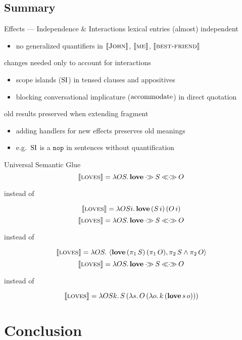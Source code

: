 \documentclass{beamer}
\begin{document}
\subsection{Summary}

\begin{frame}{Effects --- Independence \& Interactions}
  lexical entries (almost) independent
  \begin{itemize}
  \item no generalized quantifiers in $\llbracket \textsc{John} \rrbracket$, $\llbracket \textsc{me} \rrbracket$,
    $\llbracket \textsc{best-friend} \rrbracket$
  \end{itemize}

  changes needed only to account for interactions
  \begin{itemize}
  \item scope islands ($\operatorname{SI}$) in tensed clauses and appositives
  \item blocking conversational implicature ($\operatorname{accommodate}$) in direct
    quotation
  \end{itemize}

  old results preserved when extending fragment
  \begin{itemize}
  \item adding handlers for new effects preserves old meanings
  \item e.g.\ $\operatorname{SI}$ is a $\texttt{nop}$ in sentences without quantification
  \end{itemize}
\end{frame}


\begin{frame}{Universal Semantic Glue}
  \vspace*{-3mm}
  $$
  \llbracket \textsc{loves} \rrbracket = \lambda O S.\, \textbf{love} \mathbin{\cdot\!\!\gg} S \mathbin{\ll\!\!\cdot\!\!\gg} O
  $$
  \centerline{instead of}
  $$
  \llbracket \textsc{loves} \rrbracket = \lambda O S i.\, \textbf{love}\,(S\,i)\,(O\,i)
  $$
  \vfill
  $$
  \llbracket \textsc{loves} \rrbracket = \lambda O S.\, \textbf{love} \mathbin{\cdot\!\!\gg} S \mathbin{\ll\!\!\cdot\!\!\gg} O
  $$
  \centerline{instead of}
  $$
  \llbracket \textsc{loves} \rrbracket = \lambda O S.\, \left< \textbf{love}\,(\pi_1\,S)\,(\pi_1\,O), \pi_2\,S \land \pi_2\,O \right>
  $$
  \vfill
  $$
  \llbracket \textsc{loves} \rrbracket = \lambda O S.\, \textbf{love} \mathbin{\cdot\!\!\gg} S \mathbin{\ll\!\!\cdot\!\!\gg} O
  $$
  \centerline{instead of}
  $$
  \llbracket \textsc{loves} \rrbracket = \lambda O S k.\, S\,(\lambda s.\, O\,(\lambda o.\, k\,(\textbf{love}\,s\,o)))
  $$
\end{frame}



\section{Conclusion}
\end{document}
